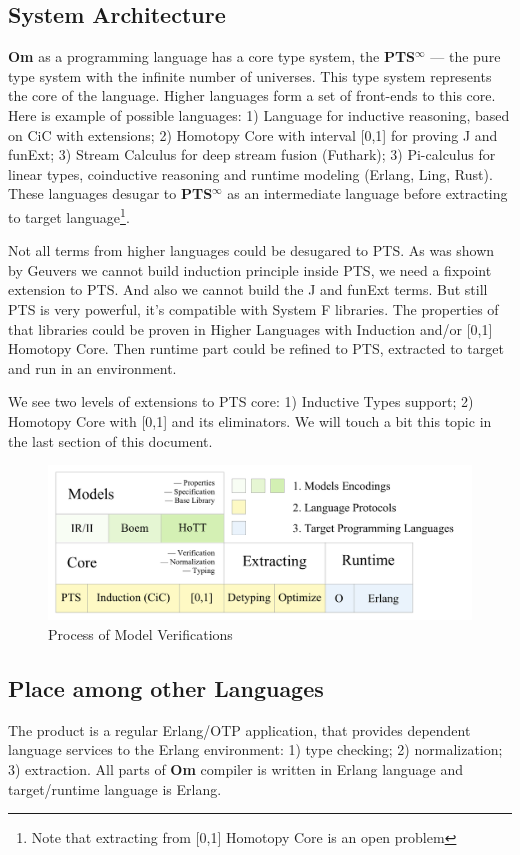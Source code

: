 \documentclass{aip-cp}
\begin{document}
\subsection{System Architecture}
{\bf Om} as a programming language
has a core type system, the {\bf PTS$^{\infty}$} --- the pure type system with the infinite number of universes.
This type system represents the core of the language. Higher languages form a set of
front-ends to this core. Here is example of possible languages:
1) Language for inductive reasoning, based on CiC with extensions;
2) Homotopy Core with interval [0,1] for proving J and funExt;
3) Stream Calculus for deep stream fusion (Futhark);
3) Pi-calculus for linear types, coinductive reasoning and runtime modeling (Erlang, Ling, Rust).
These languages desugar to {\bf PTS$^{\infty}$} as an intermediate language before
extracting to target language\footnote{Note that extracting from [0,1] Homotopy Core is an open problem}.

Not all terms from higher languages could be desugared to PTS. As was shown by
Geuvers\cite{Geuvers01} we cannot build induction principle inside PTS,
we need a fixpoint extension to PTS. And also we cannot build the J and funExt terms.
But still PTS is very powerful, it's compatible with System F libraries.
The properties of that libraries could be proven in Higher Languages
with Induction and/or [0,1] Homotopy Core. Then runtime part could be refined
to PTS, extracted to target and run in an environment.

We see two levels of extensions to PTS core: 1) Inductive Types support;
2) Homotopy Core with [0,1] and its eliminators. We will touch a bit this
topic in the last section of this document.

\begin{figure}[h]
  \centerline{\includegraphics[scale=0.28]{static}}
  \caption{Process of Model Verifications}
\end{figure}

\subsection{Place among other Languages}
The product is a regular Erlang/OTP application,
that provides dependent language services to the Erlang environment:
1) type checking; 2) normalization; 3) extraction. All parts of {\bf Om}
compiler is written in Erlang language and target/runtime language is Erlang.
\end{document}
